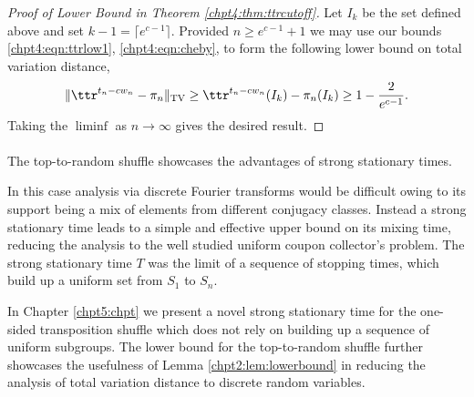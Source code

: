 \documentclass[11pt]{report}
\begin{document}
\begin{proof}[Proof of Lower Bound in Theorem \ref{chpt4:thm:ttrcutoff}]
	Let $I_{k}$ be the set defined above and set $k-1= \lceil e^{c-1} \rceil$. Provided $n \geq e^{c-1} + 1$ we may use our bounds \eqref{chpt4:eqn:ttrlow1}, \eqref{chpt4:eqn:cheby}, to form the following lower bound on total variation distance,
	\[\lVert \ttr^{t_{n} -cw_{n}} - \pi_{n} 
	\rVert_{\tiny \textnormal{TV}} \geq  \ttr^{t_{n} - cw_{n}}(I_{k}) - \pi_{n}(I_{k})  \geq 1 -\frac{2}{e^{c-1}}.\]
	Taking the $\liminf$ as $n \to \infty$ gives the desired result.
	
	
	
	
	
	
	
	
	
	
	
	
\end{proof}





















\paragraph{}
The top-to-random shuffle showcases the advantages of strong stationary times. 

In this case
analysis via discrete Fourier transforms would 
be difficult owing to its support being a mix of elements from different 
conjugacy classes. Instead a strong stationary time leads 
to a simple and effective upper bound on its mixing time, reducing the 
analysis to the well studied uniform coupon collector's problem. 
The strong stationary time $T$ was the limit of a sequence of stopping times, which build up a uniform set from $S_{1}$ to $S_{n}$. 

In Chapter \ref{chpt5:chpt} we present a novel strong stationary time for the one-sided transposition shuffle which does not rely on building up a sequence of uniform subgroups. The lower bound for the top-to-random shuffle further showcases the usefulness of Lemma \ref{chpt2:lem:lowerbound} in reducing the analysis of total variation distance to discrete random variables.
\end{document}
